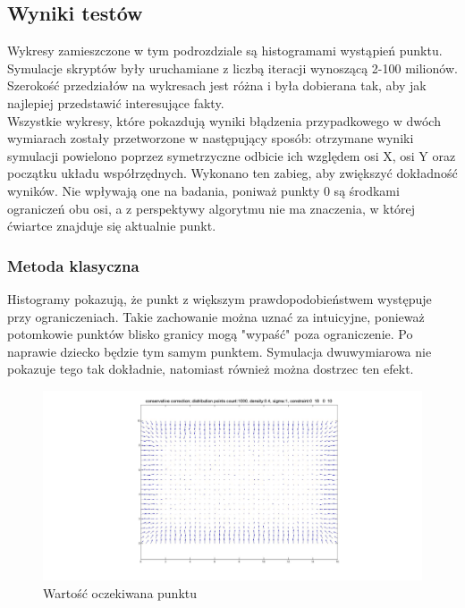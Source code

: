 \documentclass{mini}
\begin{document}
\subsection{Wyniki testów}
Wykresy zamieszczone w tym podrozdziale są histogramami wystąpień punktu. Symulacje skryptów były uruchamiane z liczbą iteracji wynoszącą 2-100 milionów. Szerokość przedziałów na wykresach jest różna i była dobierana tak, aby jak najlepiej przedstawić interesujące fakty.\\
Wszystkie wykresy, które pokazdują wyniki błądzenia przypadkowego w dwóch wymiarach zostały przetworzone w następujący sposób: otrzymane wyniki symulacji powielono poprzez symetrzyczne odbicie ich względem osi X, osi Y oraz początku układu współrzędnych. Wykonano ten zabieg, aby zwiększyć dokładność wyników. Nie wpływają one na badania, poniważ punkty 0 są środkami ograniczeń obu osi, a z perspektywy algorytmu nie ma znaczenia, w której ćwiartce znajduje się aktualnie punkt.

\subsubsection*{Metoda klasyczna}
Histogramy pokazują, że punkt z większym prawdopodobieństwem występuje przy ograniczeniach. Takie zachowanie można uznać za intuicyjne, ponieważ potomkowie punktów blisko granicy mogą "wypaść" poza ograniczenie. Po naprawie dziecko będzie tym samym punktem. Symulacja dwuwymiarowa nie pokazuje tego tak dokładnie, natomiast również można dostrzec ten efekt.

\begin{figure}[H]
\centering
\includegraphics[width=\textwidth]{conservative2dprzesuniecie}
\caption{Wartość oczekiwana punktu}
\end{figure}
\end{document}
